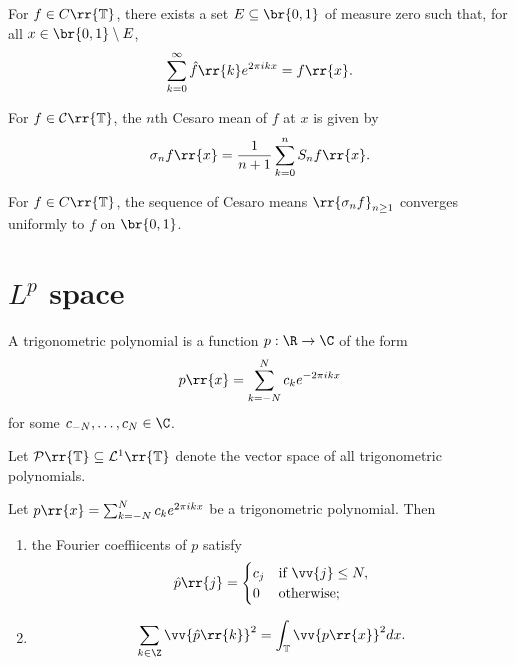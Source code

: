 \documentclass{article}
\begin{document}
\begin{theorem}[Carleson]
  For $f\in C\rr{\mathbb T}$, there exists a set $E\subseteq\br{0,1}$ of measure zero
  such that, for all $x\in \br{0,1}\setminus E$,
  \begin{align*}
    \sum_{k=0}^\infty \hat f\rr{k}e^{2\pi i k x} = f\rr{x}.
  \end{align*}
\end{theorem}

\begin{definition}
  For $f\in\mathcal C\rr{\mathbb T}$, the $n$th Cesaro mean of $f$ at $x$ is
  given by
  \begin{align*}
    \sigma_n f\rr{x} = \frac{1}{n+1} \sum_{k=0}^n S_n f\rr{x}.
  \end{align*}
\end{definition}

\begin{theorem}
  For $f\in C\rr{\mathbb T}$, the sequence of Cesaro means $\rr{\sigma_n f}_{n\geq 1}$
  converges uniformly to $f$ on $\br{0,1}$.
\end{theorem}

\section{$L^p$ space}\label{sec:lp_space}

\begin{definition}
  A trigonometric polynomial is a function $p:\R\to\C$ of the form
  \begin{align*}
    p\rr{x} = \sum_{k=-N}^N c_k e^{-2\pi i k x}
  \end{align*}
  for some $c_{-N},\ldots,c_N\in\C$.

  Let $\mathcal P\rr{\mathbb T}\subseteq\mathcal L^1\rr{\mathbb T}$ denote the vector space
  of all trigonometric polynomials.
\end{definition}

\begin{lemma}
  Let $p\rr{x}=\sum_{k=-N}^{ N } c_k e^{2\pi i k x}$ be a trigonometric polynomial.
  Then
  \begin{enumerate}
    \item the Fourier coeffiicents of $p$ satisfy
      \begin{align*}
        \hat p\rr{j}=\begin{cases}
          c_j &\text{if }\vv{j}\leq N,\\
          0 & \text{otherwise;}
        \end{cases}
      \end{align*}
    \item \begin{align*}
        \sum_{k\in\Z}\vv{\hat p\rr{k}}^2 = \int_{\mathbb T}\vv{p\rr{x}}^2 dx.
      \end{align*}
  \end{enumerate}
\end{lemma}
\end{document}
